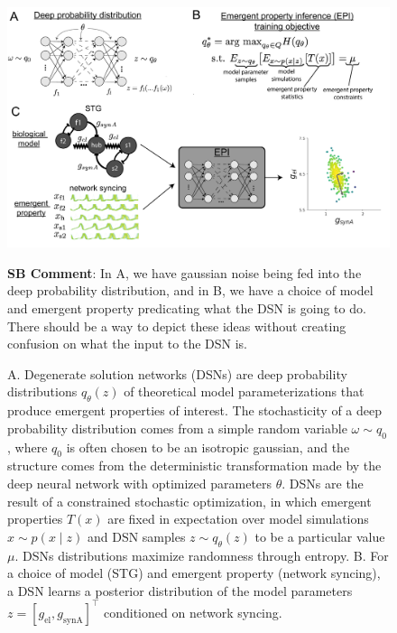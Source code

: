 \documentclass[11pt]{article}
\begin{document}
\begin{figure}
\begin{center}
\includegraphics[scale=0.4]{figs/fig2/fig2.pdf}
\end{center}
\caption{A. Degenerate solution networks (DSNs) are deep probability distributions $q_\theta(z)$ of theoretical model parameterizations that produce emergent properties of interest.  The stochasticity of a deep probability distribution comes from a simple random variable $\omega \sim q_0$, where $q_0$ is often chosen to be an isotropic gaussian, and the structure comes from the deterministic transformation made by the deep neural network with optimized parameters $\theta$.  DSNs are the result of a constrained stochastic optimization, in which emergent properties $T(x)$ are fixed in expectation over model simulations $x \sim p(x \mid z)$ and DSN samples $z \sim q_\theta(z)$ to be a particular value $\mu$.  DSNs distributions maximize randomness through entropy. B. For a choice of model (STG) and emergent property (network syncing), a DSN learns a posterior distribution of the model parameters  $z = \left[g_{\text{el}}, g_{\text{synA}} \right]^\top$ conditioned on network syncing.}
\textbf{SB Comment}: In A, we have gaussian noise being fed into the deep probability distribution, and in B, we have a choice of model and emergent property predicating what the DSN is going to do.  There should be a way to depict these ideas without creating confusion on what the input to the DSN is.
\end{figure}
\end{document}
